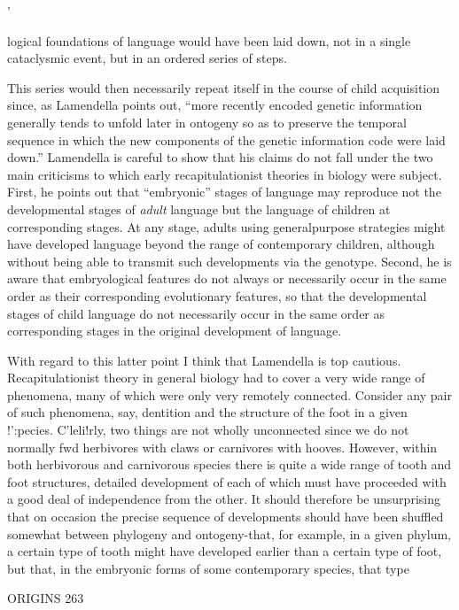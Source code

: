 '


logical foundations of language would have been laid down, not in a single cataclysmic event, but in an ordered series of steps.

This series would then necessarily repeat itself in the course of child acquisition since, as Lamendella points out, ``more recently en\-coded genetic information generally tends to unfold later in ontogeny so as to preserve the temporal sequence in which the new components of the genetic information code were laid down.'' Lamendella is careful to show that his claims do not fall under the two main criticisms to which early recapitulationist theories in biology were subject. First, he points out that ``embryonic'' stages of language may reproduce not the developmental stages of \textit{adult} language but the language of children at corresponding stages. At any stage, adults using general\-purpose strategies might have developed language beyond the range of contemporary children, although without being able to transmit such developments via the genotype. Second, he is aware that embryological features do not always or necessarily occur in the same order as their corresponding evolutionary features, so that the developmental stages of child language do not necessarily occur in the same order as corre\-sponding stages in the original development of language.

With regard to this latter point I think that Lamendella is top cautious. Recapitulationist theory in general biology had to cover a very wide range of phenomena, many of which were only very re\-motely connected. Consider any pair of such phenomena, say, dentition and the structure of the foot in a given !':pecies. C'leli!rly, two things are not wholly unconnected since we do not normally fwd herbivores with claws or carnivores with hooves. However, within both herbivorous and carnivorous species there is quite a wide range of tooth and foot structures, detailed development of each of which must have proceeded with a good deal of independence from the other. It should therefore be unsurprising that on occasion the precise sequence of developments should have been shuffled somewhat between phylogeny and ontogeny{}-that, for example, in a given phylum, a certain type of tooth might have developed earlier than a certain type of foot, but that, in the embryonic forms of some contemporary species, that type

ORIGINS 263

